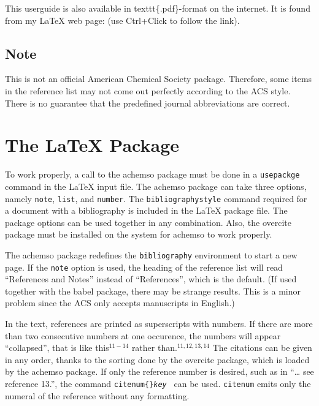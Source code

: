 \documentclass{article}
\begin{document}
This userguide is also available in \TEXTsymbol{\backslash}%
texttt\{.pdf\}-format on the internet. It is found from my \LaTeX{} web
page: 
(use Ctrl+Click to follow the link).

\subsection{Note}

This is not an official American Chemical Society package. Therefore, some
items in the reference list may not come out perfectly according to the ACS
style. There is no guarantee that the predefined journal abbreviations are
correct.

\section{The LaTeX Package}

To work properly, a call to the \textsf{achemso} package must be done in a 
\texttt{usepackge} command in the LaTeX input file. The \textsf{achemso}
package can take three options, namely \texttt{note}, \texttt{list}, and 
\texttt{number}. The \texttt{bibliographystyle} command required for a
document with a bibliography is included in the LaTeX package file. The
package options can be used together in any combination. Also, the \textsf{%
overcite} package must be installed on the system for \textsf{achemso} to
work properly.

The \textsf{achemso} package redefines the \texttt{bibliography} environment
to start a new page. If the \texttt{note} option is used, the heading of the
reference list will read ``References and Notes'' instead of ``References'',
which is the default. (If used together with the \textsf{babel} package,
there may be strange results. This is a minor problem since the ACS only
accepts manuscripts in English.)

In the text, references are printed as superscripts with numbers. If there
are more than two consecutive numbers at one occurence, the numbers will
appear ``collapsed'', that is like this$^{11-14}$ rather than.$%
^{11,12,13,14} $ The citations can be given in any order, thanks to the
sorting done by the \textsf{overcite} package, which is loaded by the 
\textsf{achemso} package. If only the reference number is desired, such as
in ``\ldots{} see reference 13.'', the command \texttt{citenum\{\}\textit{key%
}} can be used. \texttt{citenum} emits only the numeral of the reference
without any formatting.
\end{document}
